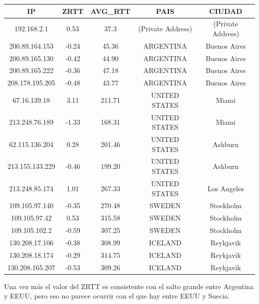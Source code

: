 \begin{tabular}{|c@{\hspace{5ex}}c@{\hspace{5ex}}c@{\hspace{5ex}}c@{\hspace{5ex}}c|}
 \hline
 \rule{0pt}{1.2em}IP & ZRTT & AVG\_RTT & PAIS & CIUDAD\\[0.2em]
 \hline

\rule{0pt}{1.2em} 192.168.2.1  &  0.53 & 37.3 & (Private Address) & (Private Address) \\[0.2em]
\rule{0pt}{1.2em} 200.89.164.153  &  -0.24 & 45.36 & ARGENTINA & Buenos Aires \\[0.2em]
\rule{0pt}{1.2em} 200.89.165.130  &  -0.42 & 44.90 & ARGENTINA & Buenos Aires \\[0.2em]
\rule{0pt}{1.2em} 200.89.165.222  &  -0.36 & 47.18 & ARGENTINA & Buenos Aires \\[0.2em]
\rule{0pt}{1.2em} 208.178.195.205  &  -0.48 & 43.77 & ARGENTINA & Buenos Aires \\[0.2em]
\rule{0pt}{1.2em} 67.16.139.18  &  3.11 & 211.71 & UNITED STATES & Miami \\[0.2em]
\rule{0pt}{1.2em} 213.248.76.189  &  -1.33 & 168.31 & UNITED STATES & Miami \\[0.2em]
\rule{0pt}{1.2em} 62.115.136.204  &  0.28 & 201.46 & UNITED STATES & Ashburn \\[0.2em]
\rule{0pt}{1.2em} 213.155.133.229  &  -0.46 & 199.20 & UNITED STATES & Ashburn \\[0.2em]
\rule{0pt}{1.2em} 213.248.85.174  &  1.01 & 267.33 & UNITED STATES & Los Angeles \\[0.2em]
\rule{0pt}{1.2em} 109.105.97.140  &  -0.35 & 270.48 & SWEDEN & Stockholm \\[0.2em]
\rule{0pt}{1.2em} 109.105.97.42  &  0.53 & 315.58 & SWEDEN & Stockholm \\[0.2em]
\rule{0pt}{1.2em} 109.105.102.2  &  -0.59 & 307.25 & SWEDEN & Stockholm \\[0.2em]
\rule{0pt}{1.2em} 130.208.17.106  &  -0.38 & 308.99 & ICELAND & Reykjavik \\[0.2em]
\rule{0pt}{1.2em} 130.208.18.174  &  -0.29 & 314.75 & ICELAND & Reykjavik \\[0.2em]
\rule{0pt}{1.2em} 130.208.165.207  &  -0.53 & 309.26 & ICELAND & Reykjavik \\[0.2em]
\hline
 \end{tabular}

 Una vez más el valor del ZRTT es consistente con el salto grande entre Argentina y EEUU, pero eso no parece ocurrir con el que hay entre EEUU y Suecia.

